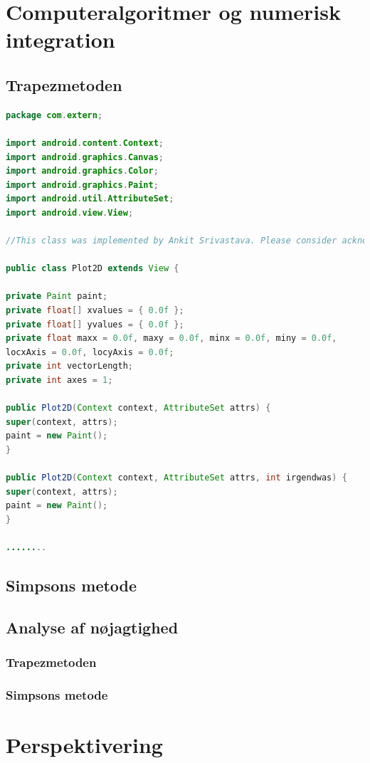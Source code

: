 \documentclass[12pt]{article}
\numberwithin{equation}{section}
\begin{document}
\section{Computeralgoritmer og numerisk integration}
\subsection{Trapezmetoden}
\begin{lstlisting}[language=Java, caption="Hello.javascript"]
package com.extern;

import android.content.Context;
import android.graphics.Canvas;
import android.graphics.Color;
import android.graphics.Paint;
import android.util.AttributeSet;
import android.view.View;

//This class was implemented by Ankit Srivastava. Please consider acknowledging the author if it ends up being useful to you.

public class Plot2D extends View {

private Paint paint;
private float[] xvalues = { 0.0f };
private float[] yvalues = { 0.0f };
private float maxx = 0.0f, maxy = 0.0f, minx = 0.0f, miny = 0.0f,
locxAxis = 0.0f, locyAxis = 0.0f;
private int vectorLength;
private int axes = 1;

public Plot2D(Context context, AttributeSet attrs) {
super(context, attrs);
paint = new Paint();
}

public Plot2D(Context context, AttributeSet attrs, int irgendwas) {
super(context, attrs);
paint = new Paint();
}

........

\end{lstlisting}
\subsection{Simpsons metode}
\subsection{Analyse af nøjagtighed}
\subsubsection{Trapezmetoden}
\subsubsection{Simpsons metode}

\section{Perspektivering}
\end{document}
